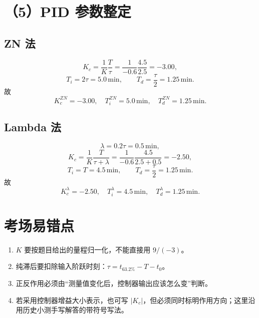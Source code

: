 \documentclass[UTF8,a4paper,11pt]{ctexart}
\begin{document}
\section*{（5）PID 参数整定}
\subsection*{ZN 法}
\[
K_c=\frac{1}{K}\frac{T}{\tau}
=\frac{1}{-0.6}\frac{4.5}{2.5}=-3.00,
\]
\[
T_i=2\tau=5.0\,\mathrm{min},\qquad
T_d=\frac{\tau}{2}=1.25\,\mathrm{min}.
\]
故
\[
\boxed{K_c^{ZN}=-3.00,\quad T_i^{ZN}=5.0\,\mathrm{min},\quad T_d^{ZN}=1.25\,\mathrm{min}}.
\]

\subsection*{Lambda 法}
\[
\lambda=0.2\tau=0.5\,\mathrm{min},
\]
\[
K_c=\frac{1}{K}\frac{T}{\tau+\lambda}
=\frac{1}{-0.6}\frac{4.5}{2.5+0.5}=-2.50,
\]
\[
T_i=T=4.5\,\mathrm{min},\qquad
T_d=\frac{\tau}{2}=1.25\,\mathrm{min}.
\]
故
\[
\boxed{K_c^{\lambda}=-2.50,\quad T_i^{\lambda}=4.5\,\mathrm{min},\quad T_d^{\lambda}=1.25\,\mathrm{min}}.
\]

\section*{考场易错点}
\begin{enumerate}
\item $K$ 要按题目给出的量程归一化，不能直接用 $9/(-3)$。
\item 纯滞后要扣除输入阶跃时刻：$\tau=t_{63.2\%}-T-t_0$。
\item 正反作用必须由“测量值变化后，控制器输出应该怎么变”判断。
\item 若采用控制器增益大小表示，也可写 $|K_c|$，但必须同时标明作用方向；这里沿用历史小测手写解答的带符号写法。
\end{enumerate}
\end{document}
